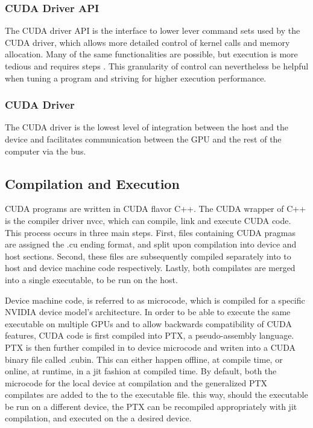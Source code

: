\subsubsection{CUDA Driver API}
The CUDA driver API is the interface to lower lever command sets used by the CUDA driver, which allows more detailed control
of kernel calls and memory allocation. Many of the same functionalities are possible,
but execution is more tedious and requires steps \cite{nvidia_cuda_driver}. This granularity of control can nevertheless be
helpful when tuning a program and striving for higher execution performance.
\subsubsection{CUDA Driver}

The CUDA driver is the lowest level of integration between the host and the device
and facilitates communication between the \Gls{GPU} and the rest of the computer via the bus. %


\subsection{Compilation and Execution}


CUDA programs are written in CUDA flavor C++.  The CUDA wrapper of C++ is the
compiler driver nvcc, which can compile, link and execute CUDA code.  This process occurs
 in three main steps. First,
files containing CUDA pragmas are assigned the .cu ending format, and split upon
compilation into device and host sections.  Second, these files are subsequently
compiled separately into to host and device machine code respectively.
Lastly, both compilates are merged into a single executable, to be run on the host.
\par
Device machine code, is referred to as  microcode, which is compiled for a specific
NVIDIA device model's architecture. In order to be able to execute the same executable
on multiple \Glspl{GPU} and to allow backwards compatibility of CUDA features, CUDA code is
first compiled into \Gls{PTX}, a pseudo-assembly language.  \Gls{PTX} is then
further compiled in to device microcode and writen into a CUDA binary file called .cubin. This can either happen offline, at compile time,
or online, at runtime, in a \gls{jit} fashion at compiled time.  By default, both
the microcode for the local device at compilation and the generalized \gls{PTX} compilates are added to the to the executable file.
this way, should the executable be run on a different device, the \gls{PTX} can
be recompiled appropriately with \Gls{jit} compilation, and executed on the a desired device\cite{Wilt}.

